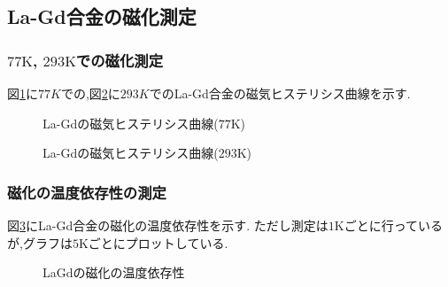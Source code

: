 \subsection{La-Gd合金の磁化測定}
\subsubsection{$77\si{\kelvin}$, $293\si{\kelvin}$での磁化測定}
図\ref{fig:LaGd_hysteresis_77K}に$77K$での,図\ref{fig:LaGd_hysteresis_293K}に$293K$でのLa-Gd合金の磁気ヒステリシス曲線を示す.
\begin{figure}[hptb]
  \begin{center}
    
    \caption{La-Gdの磁気ヒステリシス曲線($77\si{\kelvin}$)}
    \label{fig:LaGd_hysteresis_77K}
  \end{center}
\end{figure}
\begin{figure}[hptb]
  \begin{center}
    
    \caption{La-Gdの磁気ヒステリシス曲線($293\si{\kelvin}$)}
    \label{fig:LaGd_hysteresis_293K}
  \end{center}
\end{figure}
\newpage
\subsubsection{磁化の温度依存性の測定}
図\ref{fig:LaGd_J-Temp}にLa-Gd合金の磁化の温度依存性を示す.
ただし測定は$1\si{\kelvin}$ごとに行っているが,グラフは$5\si{\kelvin}$ごとにプロットしている.
\begin{figure}[hptb]
  \begin{center}
    
    \caption{LaGdの磁化の温度依存性}
    \label{fig:LaGd_J-Temp}
  \end{center}
\end{figure}